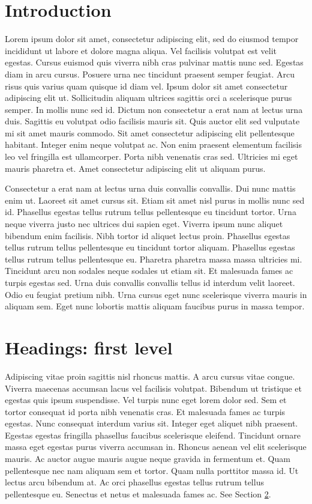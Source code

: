 \section{Introduction}
Lorem ipsum dolor sit amet, consectetur adipiscing elit, sed do eiusmod tempor incididunt ut labore et dolore magna aliqua. Vel facilisis volutpat est velit egestas. Cursus euismod quis viverra nibh cras pulvinar mattis nunc sed. Egestas diam in arcu cursus. Posuere urna nec tincidunt praesent semper feugiat. Arcu risus quis varius quam quisque id diam vel. Ipsum dolor sit amet consectetur adipiscing elit ut. Sollicitudin aliquam ultrices sagittis orci a scelerisque purus semper. In mollis nunc sed id. Dictum non consectetur a erat nam at lectus urna duis. Sagittis eu volutpat odio facilisis mauris sit. Quis auctor elit sed vulputate mi sit amet mauris commodo. Sit amet consectetur adipiscing elit pellentesque habitant. Integer enim neque volutpat ac. Non enim praesent elementum facilisis leo vel fringilla est ullamcorper. Porta nibh venenatis cras sed. Ultricies mi eget mauris pharetra et. Amet consectetur adipiscing elit ut aliquam purus.

Consectetur a erat nam at lectus urna duis convallis convallis. Dui nunc mattis enim ut. Laoreet sit amet cursus sit. Etiam sit amet nisl purus in mollis nunc sed id. Phasellus egestas tellus rutrum tellus pellentesque eu tincidunt tortor. Urna neque viverra justo nec ultrices dui sapien eget. Viverra ipsum nunc aliquet bibendum enim facilisis. Nibh tortor id aliquet lectus proin. Phasellus egestas tellus rutrum tellus pellentesque eu tincidunt tortor aliquam. Phasellus egestas tellus rutrum tellus pellentesque eu. Pharetra pharetra massa massa ultricies mi. Tincidunt arcu non sodales neque sodales ut etiam sit. Et malesuada fames ac turpis egestas sed. Urna duis convallis convallis tellus id interdum velit laoreet. Odio eu feugiat pretium nibh. Urna cursus eget nunc scelerisque viverra mauris in aliquam sem. Eget nunc lobortis mattis aliquam faucibus purus in massa tempor.


\section{Headings: first level}
\label{sec:headings}

Adipiscing vitae proin sagittis nisl rhoncus mattis. A arcu cursus vitae congue. Viverra maecenas accumsan lacus vel facilisis volutpat. Bibendum ut tristique et egestas quis ipsum suspendisse. Vel turpis nunc eget lorem dolor sed. Sem et tortor consequat id porta nibh venenatis cras. Et malesuada fames ac turpis egestas. Nunc consequat interdum varius sit. Integer eget aliquet nibh praesent. Egestas egestas fringilla phasellus faucibus scelerisque eleifend. Tincidunt ornare massa eget egestas purus viverra accumsan in. Rhoncus aenean vel elit scelerisque mauris. Ac auctor augue mauris augue neque gravida in fermentum et. Quam pellentesque nec nam aliquam sem et tortor. Quam nulla porttitor massa id. Ut lectus arcu bibendum at. Ac orci phasellus egestas tellus rutrum tellus pellentesque eu. Senectus et netus et malesuada fames ac. See Section \ref{sec:headings}.

